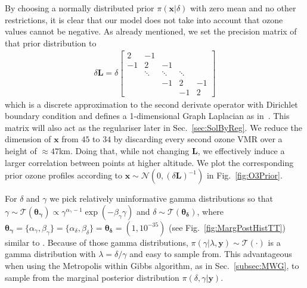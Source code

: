 By choosing a normally distributed prior $\pi(\bm{x}|\delta)$ with zero mean and no other restrictions, it is clear that our model does not take into account that ozone values cannot be negative.
As already mentioned, we set the precision matrix of that prior distribution to
\begin{align}
	\delta \bm{L} =
	\delta
	\begin{bmatrix}
		2 & -1 & & &  \\
		-1 & 2 & -1 & &   \\
		& \ddots & \ddots & \ddots &\\ 
		& & -1 & 2 & -1  \\
		& & & -1 & 2 
	\end{bmatrix} 
	\label{eq:GLapl} 
\end{align}
which is a discrete approximation to the second derivate operator with Dirichlet boundary condition and defines a 1-dimensional Graph Laplacian as in~\cite{wang2015graphs, fox2016fast}.
This matrix will also act as the regulariser later in Sec.~\ref{sec:SolByReg}.
We reduce the dimension of $\bm{x}$ from $45$ to $34$ by discarding every second ozone VMR over a height of $\approx47$km.
Doing that, while not changing $\bm{L}$, we effectively induce a larger correlation between points at higher altitude.
We plot the corresponding prior ozone profiles according to $\bm{x}\sim \mathcal{N}(0, (\delta \bm{L})^{-1})$ in Fig.~\ref{fig:O3Prior}.

For $\delta$ and $\gamma$ we pick relatively uninformative gamma distributions so that $\gamma \sim \mathcal{T}(\bm{\theta_{\gamma}}) \propto \gamma^{\alpha_\gamma -1 } \exp{( -\beta_\gamma \gamma) } $ and $\delta \sim \mathcal{T}(\bm{\theta_{\delta}})$, where $\bm{\theta_{\gamma}} = \{  \alpha_\gamma, \beta_\gamma\}  = \{ \alpha_\delta ,\beta_\delta\} = \bm{\theta_{\delta}} = (1,10^{-35})$ (see Fig.~\ref{fig:MargPostHistTT}) similar to \cite{fox2016fast}.
Because of those gamma distributions, $\pi(\gamma | \lambda, \bm{y}) \sim \mathcal{T}(\cdot)$ is a gamma distribution with $\lambda = \delta / \gamma $ and easy to sample from.
This advantageous when using the Metropolis within Gibbs algorithm, as in Sec.~\ref{subsec:MWG}, to sample from the marginal posterior distribution $\pi(\delta, \gamma | \bm{y})$.

